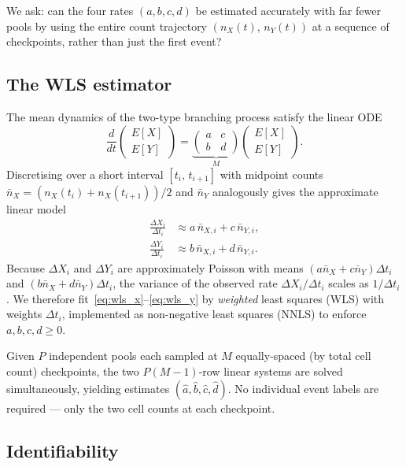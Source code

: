 \documentclass[12pt]{article}
\begin{document}
We ask: can the four rates $(a,b,c,d)$ be estimated accurately with far fewer
pools by using the entire count trajectory $(n_X(t),\,n_Y(t))$ at a sequence
of checkpoints, rather than just the first event?

\subsection{The WLS estimator}
\label{subsec:traj_wls}

The mean dynamics of the two-type branching process satisfy the linear ODE
\begin{equation}
  \frac{d}{dt}\begin{pmatrix}E[X]\\E[Y]\end{pmatrix}
  = \underbrace{\begin{pmatrix}a & c \\ b & d\end{pmatrix}}_{M}
    \begin{pmatrix}E[X]\\E[Y]\end{pmatrix}.
  \label{eq:mean_ode}
\end{equation}
Discretising over a short interval $[t_i,\,t_{i+1}]$ with midpoint counts
$\bar{n}_X = (n_X(t_i)+n_X(t_{i+1}))/2$ and $\bar{n}_Y$ analogously gives
the approximate linear model
\begin{align}
  \frac{\Delta X_i}{\Delta t_i} &\approx a\,\bar{n}_{X,i} + c\,\bar{n}_{Y,i},
  \label{eq:wls_x} \\
  \frac{\Delta Y_i}{\Delta t_i} &\approx b\,\bar{n}_{X,i} + d\,\bar{n}_{Y,i}.
  \label{eq:wls_y}
\end{align}
Because $\Delta X_i$ and $\Delta Y_i$ are approximately Poisson with means
$(a\bar{n}_X + c\bar{n}_Y)\Delta t_i$ and $(b\bar{n}_X + d\bar{n}_Y)\Delta t_i$,
the variance of the observed rate $\Delta X_i/\Delta t_i$ scales as
$1/\Delta t_i$.  We therefore fit~\eqref{eq:wls_x}--\eqref{eq:wls_y} by
\emph{weighted} least squares (WLS) with weights $\Delta t_i$, implemented
as non-negative least squares (NNLS) to enforce $a,b,c,d \ge 0$.

Given $P$ independent pools each sampled at $M$ equally-spaced (by total cell
count) checkpoints, the two $P(M-1)$-row linear systems are solved
simultaneously, yielding estimates $(\hat{a},\hat{b},\hat{c},\hat{d})$.
No individual event labels are required — only the two cell counts at each
checkpoint.

\subsection{Identifiability}
\end{document}
